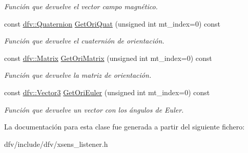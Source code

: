 \begin{DoxyCompactItemize}
\begin{DoxyCompactList}\small\item\em \-Función que devuelve el vector campo magnético. \end{DoxyCompactList}\item 
\hypertarget{classdfv_1_1XsensListener_a882a444ecd1452f22381e20780c97631}{const \hyperlink{classdfv_1_1Quaternion}{dfv\-::\-Quaternion} \hyperlink{classdfv_1_1XsensListener_a882a444ecd1452f22381e20780c97631}{\-Get\-Ori\-Quat} (unsigned int mt\-\_\-index=0) const }\label{classdfv_1_1XsensListener_a882a444ecd1452f22381e20780c97631}

\begin{DoxyCompactList}\small\item\em \-Función que devuelve el cuaternión de orientación. \end{DoxyCompactList}\item 
\hypertarget{classdfv_1_1XsensListener_a8949e2302c992ae4d78132574ccb4c27}{const \hyperlink{classdfv_1_1Matrix}{dfv\-::\-Matrix} \hyperlink{classdfv_1_1XsensListener_a8949e2302c992ae4d78132574ccb4c27}{\-Get\-Ori\-Matrix} (unsigned int mt\-\_\-index=0) const }\label{classdfv_1_1XsensListener_a8949e2302c992ae4d78132574ccb4c27}

\begin{DoxyCompactList}\small\item\em \-Función que devuelve la matriz de orientación. \end{DoxyCompactList}\item 
\hypertarget{classdfv_1_1XsensListener_a5680dd82710f4eb73521c614293da8f4}{const \hyperlink{classdfv_1_1Vector3}{dfv\-::\-Vector3} \hyperlink{classdfv_1_1XsensListener_a5680dd82710f4eb73521c614293da8f4}{\-Get\-Ori\-Euler} (unsigned int mt\-\_\-index=0) const }\label{classdfv_1_1XsensListener_a5680dd82710f4eb73521c614293da8f4}

\begin{DoxyCompactList}\small\item\em \-Función que devuelve un vector con los ángulos de \-Euler. \end{DoxyCompactList}\end{DoxyCompactItemize}


\-La documentación para esta clase fue generada a partir del siguiente fichero\-:\begin{DoxyCompactItemize}
\item 
dfv/include/dfv/xsens\-\_\-listener.\-h\end{DoxyCompactItemize}
